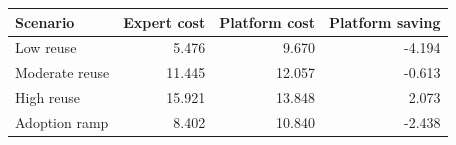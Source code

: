 \begin{tabular}{@{}lrrr@{}}
\toprule Scenario & Expert cost & Platform cost & Platform saving\\\midrule
Low reuse & 5.476 & 9.670 & -4.194\\
Moderate reuse & 11.445 & 12.057 & -0.613\\
High reuse & 15.921 & 13.848 & 2.073\\
Adoption ramp & 8.402 & 10.840 & -2.438\\
\bottomrule\end{tabular}
